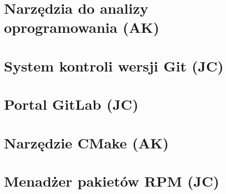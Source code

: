 \section{Narzędzia do analizy oprogramowania (AK)}

\section{System kontroli wersji Git (JC)} %
\section{Portal GitLab (JC)}

\section{Narzędzie CMake (AK)}


\section{Menadżer pakietów RPM (JC)}
